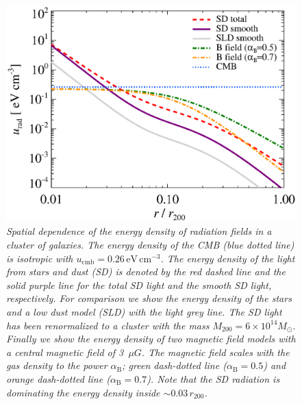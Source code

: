 \documentclass[10pt,aps,pra,reprint,amsmath,amsfonts,amssymb,showpacs,nofootinbib,floatfix]{revtex4-1}
\newcommand{\rmn}{\mathrm}
\newcommand{\msun}{M_\odot}
\newcommand{\rvir}{r_{200}}
\newcommand{\mvir}{M_{200}}
\begin{document}
\begin{figure}%
 \includegraphics[width=0.99\columnwidth]{figures/ucool.eps}
 \caption{\it Spatial dependence of the energy density of radiation
   fields in a cluster of galaxies. The energy density of the CMB
   (blue dotted line) is isotropic with
   $u_\rmn{cmb}=0.26\,\rmn{eV}\,\rmn{cm}^{-3}$. The energy density of
   the light from stars and dust (SD) is denoted by the red dashed
   line and the solid purple line for the total SD light and the
   smooth SD light, respectively. For comparison we show the energy
   density of the stars and a low dust model (SLD) with the light grey
   line. The SD light has been renormalized to a cluster with the mass
   $\mvir=6\times10^{14}\msun$. Finally we show the energy density of two
   magnetic field models with a central magnetic field of 3~$\mu
   G$. The magnetic field scales with the gas density to the power
   $\alpha_\rmn{B}$; green dash-dotted line ($\alpha_\rmn{B}=0.5$) and
   orange dash-dotted line ($\alpha_\rmn{B}=0.7$). Note that the SD
   radiation is dominating the energy density inside
   $\sim0.03\,\rvir$.}
 \label{fig:SD_Edens}
\end{figure}
\end{document}
